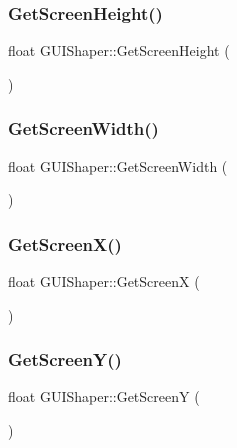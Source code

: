\hypertarget{class_g_u_i_shaper_a28a1f8639b5cd605b6dd5079549e7ad8}{}\label{class_g_u_i_shaper_a28a1f8639b5cd605b6dd5079549e7ad8} 
\subsubsection{\texorpdfstring{Get\+Screen\+Height()}{GetScreenHeight()}}
{\footnotesize\ttfamily float G\+U\+I\+Shaper\+::\+Get\+Screen\+Height (\begin{DoxyParamCaption}{ }\end{DoxyParamCaption})}

\hypertarget{class_g_u_i_shaper_a3f42fc477d646f6807d69558398bbe28}{}\label{class_g_u_i_shaper_a3f42fc477d646f6807d69558398bbe28} 
\subsubsection{\texorpdfstring{Get\+Screen\+Width()}{GetScreenWidth()}}
{\footnotesize\ttfamily float G\+U\+I\+Shaper\+::\+Get\+Screen\+Width (\begin{DoxyParamCaption}{ }\end{DoxyParamCaption})}

\hypertarget{class_g_u_i_shaper_af8fed463aacf92415fbf3c35bfcaf12d}{}\label{class_g_u_i_shaper_af8fed463aacf92415fbf3c35bfcaf12d} 
\subsubsection{\texorpdfstring{Get\+Screen\+X()}{GetScreenX()}}
{\footnotesize\ttfamily float G\+U\+I\+Shaper\+::\+Get\+ScreenX (\begin{DoxyParamCaption}{ }\end{DoxyParamCaption})}

\hypertarget{class_g_u_i_shaper_a48b2f7ad23a15a41c6cea088df60d917}{}\label{class_g_u_i_shaper_a48b2f7ad23a15a41c6cea088df60d917} 
\subsubsection{\texorpdfstring{Get\+Screen\+Y()}{GetScreenY()}}
{\footnotesize\ttfamily float G\+U\+I\+Shaper\+::\+Get\+ScreenY (\begin{DoxyParamCaption}{ }\end{DoxyParamCaption})}

